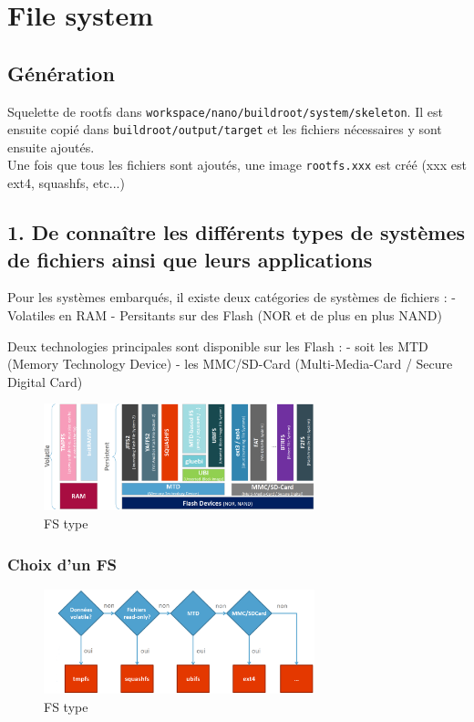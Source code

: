 \documentclass[resume]{subfiles}
\begin{document}
\section{File system}
\subsection{Génération}
Squelette de rootfs dans \verb!workspace/nano/buildroot/system/skeleton!. Il est ensuite copié dans \verb!buildroot/output/target! et les fichiers nécessaires y sont ensuite ajoutés.\\
Une fois que tous les fichiers sont ajoutés, une image \verb!rootfs.xxx! est créé (xxx est ext4, squashfs, etc...)


\subsection{}

\subsection{1. De connaître les différents types de systèmes de fichiers ainsi que leurs applications}

Pour les systèmes embarqués, il existe deux catégories de systèmes de fichiers :
- Volatiles en RAM
- Persitants sur des Flash (NOR et de plus en plus NAND)

Deux technologies principales sont disponible sur les Flash :  
- soit les MTD (Memory Technology Device)
- les MMC/SD-Card (Multi-Media-Card / Secure Digital Card)

\begin{figure}[H]
    \centering
    \includegraphics[width=0.7\textwidth]{Figures/fileSystem/fileSystemType.PNG}
    \caption{FS type}
    \label{fig:fileSystemType}
\end{figure}

\subsubsection{Choix d'un FS}
\begin{figure}[H]
    \centering
    \includegraphics[width=0.7\textwidth]{Figures/fileSystem/fileSystemChoice.PNG}
    \caption{FS type}
    \label{fig:fileSystemChoice}
\end{figure}
\end{document}
